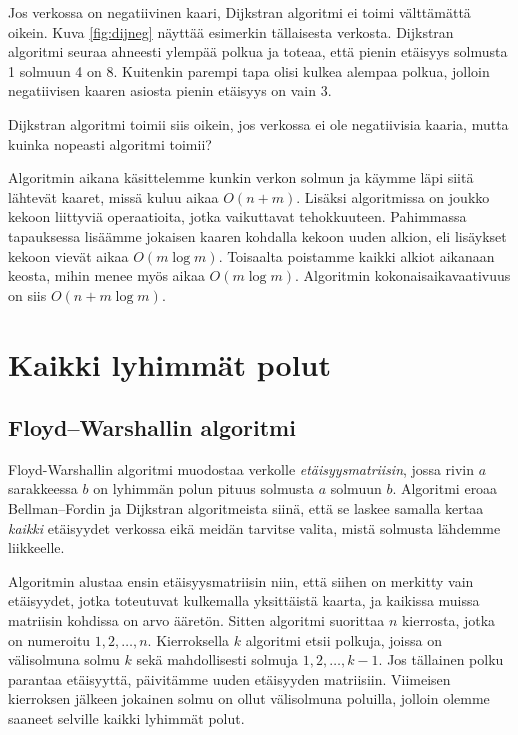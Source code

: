 Jos verkossa on negatiivinen kaari,
Dijkstran algoritmi ei toimi välttä\-mättä oikein.
Kuva \ref{fig:dijneg} näyttää esimerkin tällaisesta verkosta.
Dijkstran algoritmi seuraa ahneesti ylempää polkua ja toteaa,
että pienin etäisyys solmusta 1 solmuun 4 on 8.
Kuitenkin parempi tapa olisi kulkea alempaa polkua,
jolloin negatiivisen kaaren asiosta pienin etäisyys on vain 3.

Dijkstran algoritmi toimii siis oikein,
jos verkossa ei ole negatiivisia kaaria,
mutta kuinka nopeasti algoritmi toimii?

Algoritmin aikana käsittelemme kunkin verkon solmun
ja käymme läpi siitä lähtevät kaaret, missä kuluu aikaa $O(n+m)$.
Lisäksi algoritmissa on joukko kekoon liittyviä operaatioita,
jotka vaikuttavat tehokkuuteen.
Pahimmassa tapauksessa lisäämme jokaisen kaaren kohdalla
kekoon uuden alkion, eli lisäykset kekoon vievät aikaa $O(m \log m)$.
Toisaalta poistamme kaikki alkiot aikanaan keosta,
mihin menee myös aikaa $O(m \log m)$.
Algoritmin kokonaisaikavaativuus on siis $O(n + m \log m)$.

\section{Kaikki lyhimmät polut}

\subsection{Floyd–Warshallin algoritmi}

Floyd-Warshallin algoritmi muodostaa verkolle \emph{etäisyysmatriisin},
jossa rivin $a$ sarakkeessa $b$ on lyhimmän polun pituus
solmusta $a$ solmuun $b$.
Algoritmi eroaa Bellman–Fordin ja Dijkstran algoritmeista
siinä, että se laskee samalla kertaa \emph{kaikki} etäisyydet verkossa
eikä meidän tarvitse valita, mistä solmusta lähdemme liikkeelle.

Algoritmin alustaa ensin etäisyysmatriisin niin,
että siihen on merkitty vain etäisyydet,
jotka toteutuvat kulkemalla yksittäistä kaarta,
ja kaikissa muissa matriisin kohdissa on arvo ääretön.
Sitten algoritmi suorittaa $n$ kierrosta,
jotka on numeroitu $1,2,\dots,n$.
Kierroksella $k$ algoritmi etsii polkuja, joissa on välisolmuna
solmu $k$ sekä mahdollisesti solmuja $1,2,\dots,k-1$.
Jos tällainen polku parantaa etäisyyttä,
päivitämme uuden etäisyyden matriisiin.
Viimeisen kierroksen jälkeen jokainen solmu on ollut
välisolmuna poluilla, jolloin olemme saaneet selville
kaikki lyhimmät polut.

